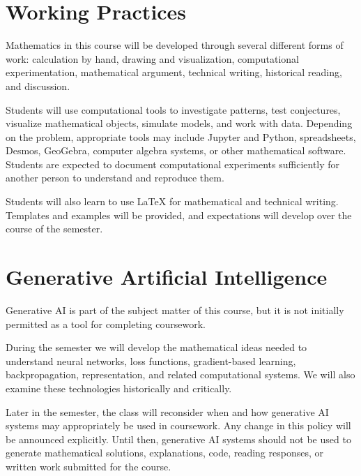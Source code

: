\documentclass[11pt]{article}
\begin{document}
\normalsize


\section{Working Practices}

Mathematics in this course will be developed through several different
forms of work: calculation by hand, drawing and visualization,
computational experimentation, mathematical argument, technical writing,
historical reading, and discussion.

Students will use computational tools to investigate patterns, test
conjectures, visualize mathematical objects, simulate models, and work
with data. Depending on the problem, appropriate tools may include
Jupyter and Python, spreadsheets, Desmos, GeoGebra, computer algebra
systems, or other mathematical software. Students are expected to
document computational experiments sufficiently for another person to
understand and reproduce them.

Students will also learn to use \LaTeX{} for mathematical and technical
writing. Templates and examples will be provided, and expectations will
develop over the course of the semester.


\section{Generative Artificial Intelligence}

Generative AI is part of the subject matter of this course, but it is
not initially permitted as a tool for completing coursework.

During the semester we will develop the mathematical ideas needed to
understand neural networks, loss functions, gradient-based learning,
backpropagation, representation, and related computational systems.
We will also examine these technologies historically and critically.

Later in the semester, the class will reconsider when and how
generative AI systems may appropriately be used in coursework. Any
change in this policy will be announced explicitly. Until then,
generative AI systems should not be used to generate mathematical
solutions, explanations, code, reading responses, or written work
submitted for the course.
\end{document}
